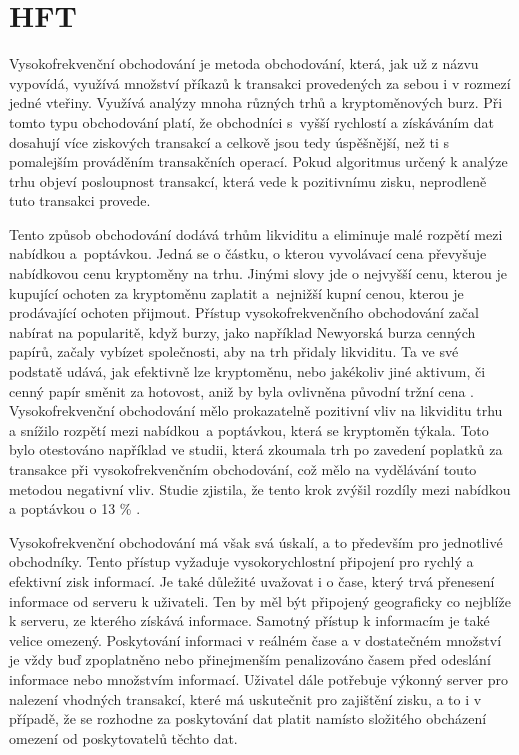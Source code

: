 \section{HFT}

Vysokofrekvenční obchodování je metoda obchodování, která, jak už z názvu vypovídá, využívá množství příkazů k transakci provedených za sebou i v rozmezí jedné vteřiny. 
Využívá analýzy mnoha různých trhů a kryptoměnových burz. 
Při tomto typu obchodování platí, že obchodníci s~vyšší rychlostí a získáváním dat dosahují více ziskových transakcí a celkově jsou tedy úspěšnější, než ti s pomalejším prováděním transakčních operací. 
Pokud algoritmus určený k analýze trhu objeví posloupnost transakcí, která vede k pozitivnímu zisku, neprodleně tuto transakci provede. 

Tento způsob obchodování dodává trhům likviditu a eliminuje malé rozpětí mezi nabídkou a~poptávkou. 
Jedná se o částku, o kterou vyvolávací cena převyšuje nabídkovou cenu kryptoměny na trhu. 
Jinými slovy jde o nejvyšší cenu, kterou je kupující ochoten za kryptoměnu zaplatit a~nejnižší kupní cenou, kterou je prodávající ochoten přijmout. 
Přístup vysokofrekvenčního obchodování začal nabírat na popularitě, když burzy, jako například Newyorská burza cenných papírů, začaly vybízet společnosti, aby na trh přidaly likviditu. 
Ta ve své podstatě udává, jak efektivně lze kryptoměnu, nebo jakékoliv jiné aktivum, či cenný papír směnit za hotovost, aniž by byla ovlivněna původní tržní cena \cite{liquidity}.
Vysokofrekvenční obchodování mělo prokazatelně pozitivní vliv na likviditu trhu a snížilo rozpětí mezi nabídkou~a poptávkou, která se kryptoměn týkala. 
Toto bylo otestováno například ve studii, která zkoumala trh po zavedení poplatků za transakce při vysokofrekvenčním obchodování, což mělo na vydělávání touto metodou negativní vliv. 
Studie zjistila, že tento krok zvýšil rozdíly mezi nabídkou a poptávkou o 13 \% \cite{hft:1, hft:2}.

Vysokofrekvenční obchodování má však svá úskalí, a to především pro jednotlivé obchodníky. 
Tento přístup vyžaduje vysokorychlostní připojení pro rychlý a efektivní zisk informací. 
Je také důležité uvažovat i o čase, který trvá přenesení informace od serveru k uživateli. 
Ten by měl být připojený geograficky co nejblíže k serveru, ze kterého získává informace. 
Samotný přístup k informacím je také velice omezený. 
Poskytování informaci v reálném čase a v dostatečném množství je vždy buď zpoplatněno nebo přinejmenším penalizováno časem před odeslání informace nebo množstvím informací. 
Uživatel dále potřebuje výkonný server pro nalezení vhodných transakcí, které má uskutečnit pro zajištění zisku, a to i v případě, že se rozhodne za poskytování dat platit namísto složitého obcházení omezení od poskytovatelů těchto dat.

